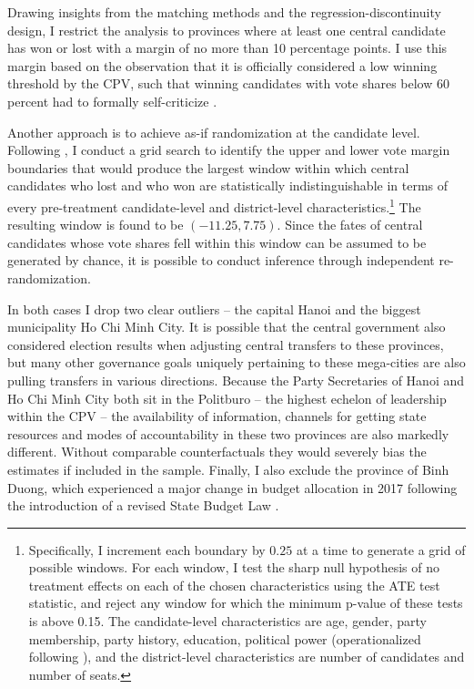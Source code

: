 \documentclass[12pt]{article}
\newcommand\fnote[1]{\footnote{\baselineskip=2\normalbaselineskip#1}}
\newcommand{\1}{\mathbbm{1}}
\begin{document}
Drawing insights from the matching methods and the regression-discontinuity design, I restrict the analysis to provinces where at least one central candidate has won or lost with a margin of no more than 10 percentage points. I use this margin based on the observation that it is officially considered a low winning threshold by the CPV, such that winning candidates with vote shares below 60 percent had to formally self-criticize \citep{MaleskySchuler2011}. 

Another approach is to achieve as-if randomization at the candidate level. Following \citet{CattaneoTitiunik2015}, I conduct a grid search to identify the upper and lower vote margin boundaries that would produce the largest window within which central candidates who lost and who won are statistically indistinguishable in terms of every pre-treatment candidate-level and district-level characteristics.\fnote{Specifically, I  increment each boundary by $0.25$ at a time to generate a grid of possible windows. For each window, I test the sharp null hypothesis of no treatment effects on each of the chosen characteristics using the ATE test statistic, and reject any window for which the minimum p-value of these tests is above 0.15. The candidate-level characteristics are age, gender, party membership, party history, education, political power (operationalized following \citet{MaleskySchuler2011}), and the district-level characteristics are number of candidates and number of seats.} The resulting window is found to be $(-11.25, 7.75)$. Since the fates of central candidates whose vote shares fell within this window can be assumed to be generated by chance, it is possible to conduct inference through independent re-randomization. 

In both cases I drop two clear outliers -- the capital Hanoi and the biggest municipality Ho Chi Minh City. It is possible that the central government also considered election results when adjusting central transfers to these provinces, but many other governance goals uniquely pertaining to these mega-cities are also pulling transfers in various directions. Because the Party Secretaries of Hanoi and Ho Chi Minh City both sit in the Politburo -- the highest echelon of leadership within the CPV -- the availability of information, channels for getting state resources and modes of accountability in these two provinces are also markedly different. Without comparable counterfactuals they would severely bias the estimates if included in the sample. Finally, I also exclude the province of Binh Duong, which experienced a major change in budget allocation in 2017 following the introduction of a revised State Budget Law \citep{BaoViet2016}.
\end{document}
